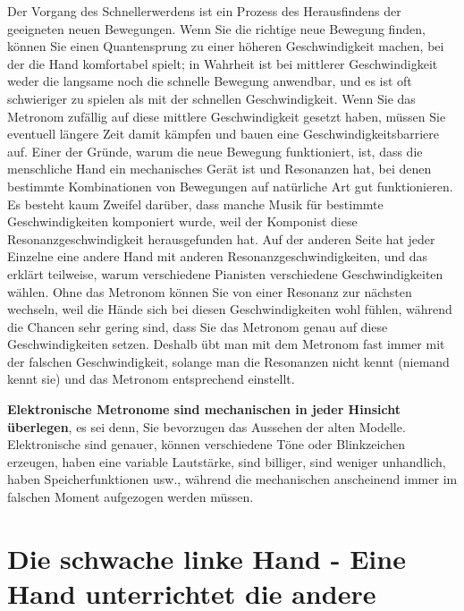 Der Vorgang des Schnellerwerdens ist ein Prozess des Herausfindens der geeigneten neuen Bewegungen.
Wenn Sie die richtige neue Bewegung finden, können Sie einen Quantensprung zu einer höheren Geschwindigkeit machen, bei der die Hand komfortabel spielt; in Wahrheit ist bei mittlerer Geschwindigkeit weder die langsame noch die schnelle Bewegung anwendbar, und es ist oft schwieriger zu spielen als mit der schnellen Geschwindigkeit.
Wenn Sie das Metronom zufällig auf diese mittlere Geschwindigkeit gesetzt haben, müssen Sie eventuell längere Zeit damit kämpfen und bauen eine Geschwindigkeitsbarriere auf.
Einer der Gründe, warum die neue Bewegung funktioniert, ist, dass die menschliche Hand ein mechanisches Gerät ist und Resonanzen hat, bei denen bestimmte Kombinationen von Bewegungen auf natürliche Art gut funktionieren.
Es besteht kaum Zweifel darüber, dass manche Musik für bestimmte Geschwindigkeiten komponiert wurde, weil der Komponist diese Resonanzgeschwindigkeit herausgefunden hat.
Auf der anderen Seite hat jeder Einzelne eine andere Hand mit anderen Resonanzgeschwindigkeiten, und das erklärt teilweise, warum verschiedene Pianisten verschiedene Geschwindigkeiten wählen.
Ohne das Metronom können Sie von einer Resonanz zur nächsten wechseln, weil die Hände sich bei diesen Geschwindigkeiten wohl fühlen, während die Chancen sehr gering sind, dass Sie das Metronom genau auf diese Geschwindigkeiten setzen.
Deshalb übt man mit dem Metronom fast immer mit der falschen Geschwindigkeit, solange man die Resonanzen nicht kennt (niemand kennt sie) und das Metronom entsprechend einstellt.

\textbf{Elektronische Metronome sind mechanischen in jeder Hinsicht überlegen}, es sei denn, Sie bevorzugen das Aussehen der alten Modelle.
Elektronische sind genauer, können verschiedene Töne oder Blinkzeichen erzeugen, haben eine variable Lautstärke, sind billiger, sind weniger unhandlich, haben Speicherfunktionen usw., während die mechanischen anscheinend immer im falschen Moment aufgezogen werden müssen.


\section{Die schwache linke Hand - Eine Hand unterrichtet die andere}
\label{c1ii20}

